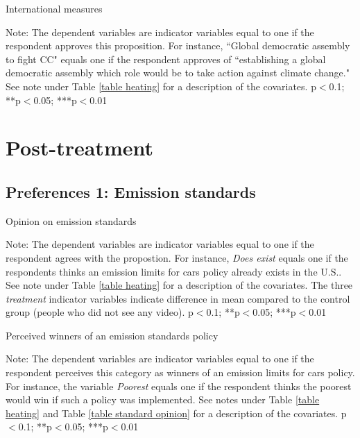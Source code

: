 \documentclass{article}
\begin{document}
\begin{landscape}
	\begin{table}[h!]
	\caption{International measures}
	\begin{center}
		\scalebox{0.6}{}
	\end{center}
	{\footnotesize Note: The dependent variables are indicator variables equal to one if the respondent approves this proposition. For instance, ``Global democratic assembly to fight CC" equals one if the respondent approves of ``establishing a global democratic assembly which role would be to take action against climate change." See note under Table \ref{table heating} for a description of the covariates.
	\newline *p$<$0.1; **p$<$0.05; ***p$<$0.01}
\end{table}	
\end{landscape}


\clearpage
\section{Post-treatment}
\subsection{Preferences 1: Emission standards}

\begin{table}[h!]
	\caption{Opinion on emission standards} \label{table standard opinion}
	\begin{center}
		\scalebox{0.7}{}
	\end{center}
	{\footnotesize Note: The dependent variables are indicator variables equal to one if the respondent agrees with the propostion. For instance, \textit{Does exist} equals one if the respondents thinks an emission limits for cars policy already exists in the U.S.. See note under Table \ref{table heating} for a description of the covariates. The three \textit{treatment} indicator variables indicate difference in mean compared to the control group (people who did not see any video).
	\newline *p$<$0.1; **p$<$0.05; ***p$<$0.01}
\end{table}	

\begin{table}[h!]
	\caption{Perceived winners of an emission standards policy}
	\begin{center}
		\scalebox{0.7}{}
	\end{center}
	{\footnotesize Note: The dependent variables are indicator variables equal to one if the respondent perceives this category as winners of an emission limits for cars policy. For instance, the variable \textit{Poorest} equals one if the respondent thinks the poorest would win if such a policy was implemented. See notes under Table \ref{table heating} and Table \ref{table standard opinion} for a description of the covariates.
	\newline *p$<$0.1; **p$<$0.05; ***p$<$0.01}
\end{table}	
\end{document}
